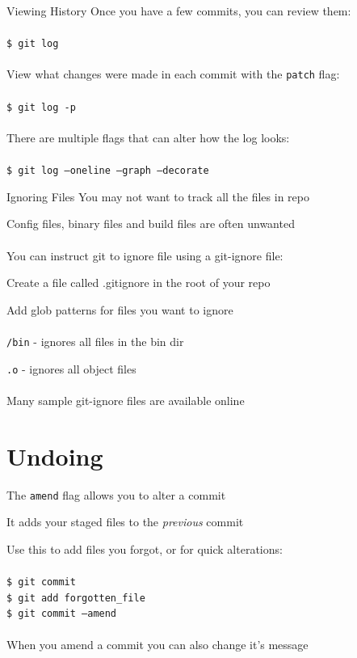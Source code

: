 \documentclass{beamer}
\begin{document}
\begin{frame}{Viewing History}
    Once you have a few commits, you can review them:\\~\\
    {\tt \$ git log} \\~\\
    View what changes were made in each commit with the {\tt patch} flag: \\~\\
    {\tt \$ git log -p} \\~\\
    There are multiple flags that can alter how the log looks: \\~\\
    {\tt \$ git log --oneline --graph --decorate}
\end{frame}

\begin{frame}{Ignoring Files}
    You may not want to track all the files in repo

    Config files, binary files and build files are often unwanted \\~\\

    You can instruct git to ignore file using a git-ignore file:

    Create a file called .gitignore in the root of your repo

    Add glob patterns for files you want to ignore \\~\\

    {\tt \slash bin} - ignores all files in the bin dir

    {\tt *.o} - ignores all object files \\~\\

    Many sample git-ignore files are available online

\end{frame}

\section{Undoing}
\begin{frame}{\secname}
    The {\tt amend} flag allows you to alter a commit

    It adds your staged files to the {\it previous} commit 

    Use this to add files you forgot, or for quick alterations:\\~\\
    {\tt \$ git commit\\
    \$ git add forgotten\_file\\
    \$ git commit --amend} \\~\\

    When you amend a commit you can also change it's message
\end{frame}
\end{document}
